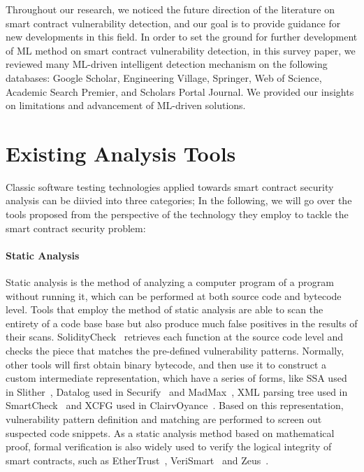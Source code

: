 Throughout our research, we noticed the future direction of the literature on smart contract vulnerability detection, and our goal is to provide guidance for new developments in this field.
In order to set the ground for further development of ML method on smart contract vulnerability detection, in this survey paper, we reviewed many ML-driven intelligent detection mechanism on the following databases: Google Scholar, Engineering Village, Springer, Web of Science, Academic Search Premier, and Scholars Portal Journal.
We provided our insights on limitations and advancement of ML-driven solutions.


\section{Existing Analysis Tools}

Classic software testing technologies applied towards smart contract security analysis can be diivied into three categories; In the following, we will go over the tools proposed from the perspective of the technology they employ to tackle the smart contract security problem:

\paragraph{Static Analysis}
Static analysis is the method of analyzing a computer program of a program without running it, which can be performed at both source code and bytecode level.
Tools that employ the method of static analysis are able to scan the entirety of a code base base but also produce much false positives in the results of their scans.
SolidityCheck~\cite{soliditycheck} retrieves each function at the source code level and checks the piece that matches the pre-defined vulnerability patterns.
Normally, other tools will first obtain binary bytecode, and then use it to construct a custom intermediate representation, which have a series of forms, like SSA used in Slither~\cite{slither}, Datalog used in Securify~\cite{securify} and MadMax~\cite{madmax}, XML parsing tree used in SmartCheck~\cite{smartcheck} and XCFG used in ClairvOyance~\cite{ClairvOyance}.
Based on this representation, vulnerability pattern definition and matching are performed to screen out suspected code snippets.
As a static analysis method based on mathematical proof, formal verification is also widely used to verify the logical integrity of smart contracts, such as EtherTrust~\cite{etehrTrust}, VeriSmart~\cite{verismart} and Zeus~\cite{kalra2018zeus}.

